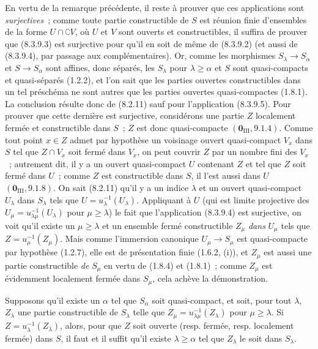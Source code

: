 En vertu de la remarque précédente, il reste à prouver que ces applications
sont \emph{surjectives}~; comme toute partie constructible de $S$ est réunion
finie d'ensembles de la forme $U\cap\complement V$, où $U$ et $V$ sont
ouverts et constructibles, il suffira de prouver que (8.3.9.3) est surjective
pour qu'il en soit de même de (8.3.9.2) (et aussi de (8.3.9.4), par passage
aux complémentaires). Or, comme les morphismes $S_\lambda\to S_\alpha$ et
$S\to S_\alpha$ sont affines, donc séparés, les $S_\lambda$ pour
$\lambda\geq\alpha$ et $S$ sont quasi-compacts et quasi-séparés (1.2.2), et
l'on sait que les parties ouvertes constructibles dans un tel préschéma ne
sont autres que les parties ouvertes quasi-compactes (1.8.1). La conclusion
résulte donc de (8.2.11) sauf pour l'application (8.3.9.5). Pour prouver que
cette dernière est surjective, considérons une partie $Z$ localement fermée
et constructible dans $S$~; $Z$ est donc quasi-compacte
$(\mathbf{0}_{\mathrm{III}},9.1.4)$. Comme tout point $x\in Z$ admet par hypothèse un
voisinage ouvert quasi-compact $V_x$ dans $S$ tel que $Z\cap V_x$ soit fermé
dans $V_x$, on peut couvrir $Z$ par un nombre fini des $V_x$~; autrement dit,
il y a un ouvert quasi-compact $U$ contenant $Z$ et tel que $Z$ soit fermé
dans $U$~; comme $Z$ est constructible dans $S$, il l'est aussi dans $U$
$(\mathbf{0}_{\mathrm{III}},9.1.8)$. On sait (8.2.11) qu'il y a un indice $\lambda$ et
un ouvert quasi-compact $U_\lambda$ dans $S_\lambda$ tels que
$U=u_\lambda^{-1}(U_\lambda)$. Appliquant à $U$ (qui est limite projective
des $U_\mu=u_{\lambda\mu}^{-1}(U_\lambda)$ pour $\mu\geq\lambda$) le fait
que l'application (8.3.9.4) est surjective, on voit qu'il existe un
$\mu\geq\lambda$ et un ensemble fermé constructible $Z_\mu$ \emph{dans} $U_\mu$
tels que $Z=u_\mu^{-1}(Z_\mu)$. Mais comme l'immersion canonique
$U_\mu\to S_\mu$ est quasi-compacte par hypothèse (1.2.7), elle est de
présentation finie (1.6.2, (i)), et $Z_\mu$ est aussi une partie constructible
\emph{de} $S_\mu$ en vertu de (1.8.4) et (1.8.1)~; comme $Z_\mu$ est
évidemment localement fermée dans $S_\mu$, cela achève la démonstration.

\begin{corollary}[8.3.12]
\label{IV.8.3.12-fr}
Supposons qu'il existe un $\alpha$ tel que $S_\alpha$ soit quasi-compact, et
soit, pour tout $\lambda$, $Z_\lambda$ une partie constructible de
$S_\lambda$ telle que
$Z_\mu=u_{\lambda\mu}^{-1}(Z_\lambda)$ pour $\mu\geq\lambda$. Si
$Z=u_\lambda^{-1}(Z_\lambda)$,
alors, pour que $Z$ soit ouverte \textup{(resp.} fermée, \textup{resp.} localement fermée) dans
$S$, il faut et il suffit qu'il existe $\lambda\geq\alpha$ tel que
$Z_\lambda$ le soit dans $S_\lambda$.
\end{corollary}

